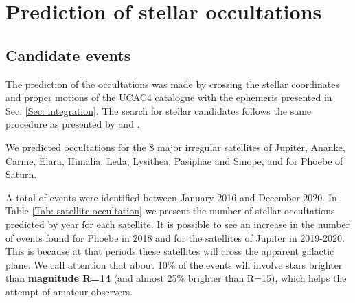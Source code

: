 \documentclass[useAMS,usenatbib]{mn2e}
\begin{document}
%
%

\section{Prediction of stellar occultations} \label{Sec: predictions}

\subsection{Candidate events}

The prediction of the occultations was made by crossing the stellar coordinates and proper motions of the UCAC4 catalogue \citep{Zacharias2013} with the ephemeris presented in Sec. \ref{Sec: integration}. The search for stellar candidates follows the same procedure as presented by \cite{Assafin2010, Assafin2012} and \cite{Camargo2014}.

We predicted occultations for the 8 major irregular satellites of Jupiter,  Ananke, Carme, Elara, Himalia, Leda, Lysithea, Pasiphae and Sinope, and for Phoebe of Saturn.

A total of \noccs events were identified between January 2016 and December 2020. In Table \ref{Tab: satellite-occultation} we present the number of stellar occultations predicted by year for each satellite. It is possible to see an increase in the number of events found for Phoebe in 2018 and for the satellites of Jupiter in 2019-2020. This is because at that periods these satellites will cross the apparent galactic plane. We call attention that about 10\% of the events will involve stars brighter than \textbf{magnitude R=14}  (and almost 25\% brighter than R=15), which helps the attempt of amateur observers.
\end{document}
